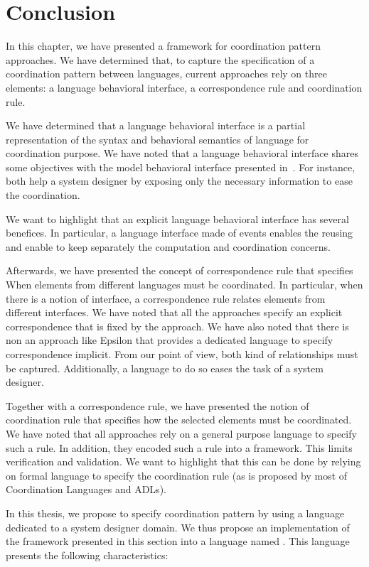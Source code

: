 \section{Conclusion}

In this chapter, we have presented a framework for coordination pattern approaches. We have determined that, to capture the specification of a coordination pattern between languages, current approaches rely on three elements: a language behavioral interface, a correspondence rule and coordination rule.    

We have determined that a language behavioral interface is a partial representation of the syntax and behavioral semantics of language for coordination purpose. We have noted that a language behavioral interface shares some objectives with the model behavioral interface presented in~\cite{background}. For instance, both help a system designer by exposing only the necessary information to ease the coordination.  

We want to highlight that an explicit language behavioral interface has several benefices. In particular, a language interface made of events enables the reusing and enable to keep separately the computation and coordination concerns. 

Afterwards, we have presented the concept of correspondence rule that specifies When elements from different languages must be coordinated. In particular, when there is a notion of interface, a correspondence rule relates elements from different interfaces. We have noted that all the approaches specify an explicit correspondence that is fixed by the approach. We have also noted that there is non an approach like Epsilon that provides a dedicated language to specify correspondence implicit. From our point of view, both kind of relationships must be captured. Additionally, a language to do so eases the task of a system designer.   

Together with a correspondence rule, we have presented the notion of coordination rule that specifies how the selected elements must be coordinated. We have noted that all approaches rely on a general purpose language to specify such a rule. In addition, they encoded such a rule into a framework. This limits verification and validation. We want to highlight that this can be done by relying on formal language to specify the coordination rule (as is proposed by most of Coordination Languages and ADLs).


In this thesis, we propose to specify coordination pattern by using a language dedicated to a system designer domain. We thus propose an implementation of the framework presented in this section into a language named \bcool.  This language presents the following characteristics: 

